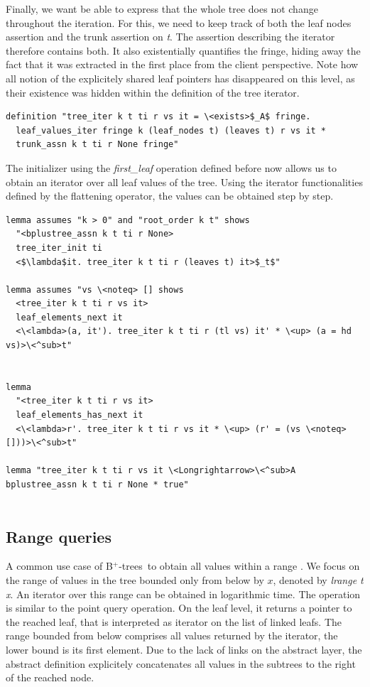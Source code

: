 \documentclass[a4paper,UKenglish,cleveref, autoref, thm-restate]{lipics-v2021}
\newcommand{\btrees}{B$^+$-trees}
\begin{document}
Finally, we want be able to express that the whole tree does not change throughout the iteration.
For this, we need to keep track of both the leaf nodes assertion and the trunk assertion on \emph{t}.
The assertion describing the iterator therefore contains both.
It also existentially quantifies the fringe, hiding away
the fact that it was extracted in the first place from the client perspective.
Note how all notion of the explicitely shared leaf pointers
has disappeared on this level, as their existence was hidden within the definition
of the tree iterator.


\begin{lstlisting}[mathescape=true, language=Isabelle,label=lst:btree-tree-iter]
definition "tree_iter k t ti r vs it = \<exists>$_A$ fringe.
  leaf_values_iter fringe k (leaf_nodes t) (leaves t) r vs it *
  trunk_assn k t ti r None fringe"
\end{lstlisting}

The initializer using the \emph{first\_leaf} operation
defined before now allows us to obtain an iterator over all leaf
values of the tree.
Using the iterator functionalities defined by the flattening operator,
the values can be obtained step by step.

\begin{lstlisting}
lemma assumes "k > 0" and "root_order k t" shows
  "<bplustree_assn k t ti r None>
  tree_iter_init ti
  <$\lambda$it. tree_iter k t ti r (leaves t) it>$_t$"

lemma assumes "vs \<noteq> [] shows
  <tree_iter k t ti r vs it>
  leaf_elements_next it
  <\<lambda>(a, it'). tree_iter k t ti r (tl vs) it' * \<up> (a = hd vs)>\<^sub>t"


lemma 
  "<tree_iter k t ti r vs it>
  leaf_elements_has_next it
  <\<lambda>r'. tree_iter k t ti r vs it * \<up> (r' = (vs \<noteq> []))>\<^sub>t"

lemma "tree_iter k t ti r vs it \<Longrightarrow>\<^sub>A bplustree_assn k t ti r None * true"
  
\end{lstlisting}



\subsection{Range queries}
\label{sec:imperative_range}

A common use case of \btrees\ 
to obtain all values within a range \cite{DBLP:journals/ftdb/Graefe11}.
We focus on the range of values in the tree bounded only from below by $x$,
denoted by \emph{lrange t x}.
An iterator over this range can be obtained in logarithmic time.
The operation is similar to the point query operation.
On the leaf level, it returns a pointer to the
reached leaf, that is interpreted as iterator on the list of linked leafs.
The range bounded from below comprises all values returned by the iterator,
the lower bound is its first element.
Due to the lack of links on the abstract layer,
the abstract definition explicitely concatenates all values in the subtrees 
to the right of the reached node.
\end{document}
